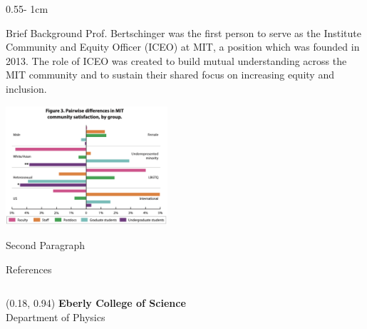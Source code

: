 \documentclass{../psuposter}
\begin{document}
\begin{frame}
\begin{columns}[t, totalwidth=\textwidth]
\begin{column}{0.55\textwidth - 1cm}
    \begin{block}{Brief Background}
    	Prof. Bertschinger was the first person to serve as the Institute Community and Equity Officer (ICEO) at MIT, a position which was founded in 2013. The role of ICEO was created to build mutual understanding across the MIT community and to sustain their shared focus on increasing equity and inclusion. 
        \begin{center}
		   	\includegraphics[width=0.45\textwidth]{images/background}    		
    	\end{center}
		Second Paragraph 
    \end{block}


    \begin{block}{References}
        
%        
		
    \end{block}

\end{column}
\end{columns}


\begin{textblock}{0.5}(0.18, 0.94)
    \color{white}
    \sffamily
    \textbf{Eberly College of Science}
    \\
    Department of Physics
\end{textblock}


\end{frame}
\end{document}
